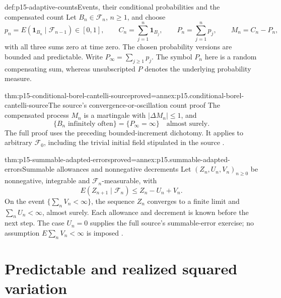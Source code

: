 \begin{hbdefinition}{def:p15-adaptive-counts}{Events, their conditional probabilities and the compensated count}
Let \(B_n\in\mathcal F_n\), \(n\geq1\), and choose
\[
 p_n=E(\mathbf1_{B_n}\mid\mathcal F_{n-1})\in[0,1],\qquad
 C_n=\sum_{j=1}^n\mathbf1_{B_j},\qquad
 P_n=\sum_{j=1}^np_j,\qquad M_n=C_n-P_n,
\]
with all three sums zero at time zero.
The chosen probability versions are bounded and predictable.
Write \(P_\infty=\sum_{j\geq1}p_j\).
The symbol \(P_n\) here is a random compensating sum, whereas
unsubscripted \(P\) denotes the underlying probability measure.
\end{hbdefinition}

\begin{hbtheorem}{thm:p15-conditional-borel-cantelli-source}{proved=annex:p15.conditional-borel-cantelli-source}{The source's convergence-or-oscillation count proof}
The compensated process \(M_n\) is a martingale with
\(|\Delta M_n|\leq1\), and
\[
                   \{B_n\text{ infinitely often}\}
                                  =\{P_\infty=\infty\}
                                          \quad\text{almost surely}.
\]
The full proof uses the preceding bounded-increment dichotomy.
It applies to arbitrary \(\mathcal F_0\), including the trivial
initial field stipulated in the source
\cite[ex.~4.3.3, thm.~4.3.4]{DurrettPTEAuthor2019}.
\end{hbtheorem}

\begin{hbtheorem}{thm:p15-summable-adapted-errors}{proved=annex:p15.summable-adapted-errors}{Summable allowances and nonnegative decrements}
Let \((Z_n,U_n,V_n)_{n\geq0}\) be nonnegative, integrable and
\(\mathcal F_n\)-measurable, with
\[
                 E(Z_{n+1}\mid\mathcal F_n)
                                 \leq Z_n-U_n+V_n.
\]
On the event \(\{\sum_nV_n<\infty\}\), the sequence \(Z_n\)
converges to a finite limit and \(\sum_nU_n<\infty\), almost surely.
Each allowance and decrement is known before the next step.
The case \(U_n=0\) supplies the full source's summable-error exercise;
no assumption \(E\sum_nV_n<\infty\) is imposed
\cite[ex.~4.3.3]{DurrettPTEAuthor2019}.
\end{hbtheorem}

\section{Predictable and realized squared variation}
\label{sec:p15-quadratic-variation-definitions}

